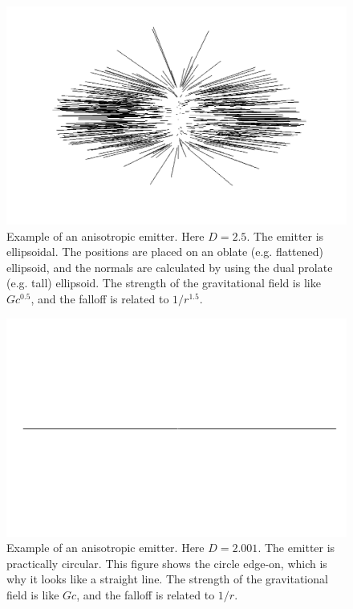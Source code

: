 \documentclass[12pt]{article}
\begin{document}
\begin{figure} 
\centering
  \includegraphics[width = 5 in]{2.5.png}
  \caption{
Example of an anisotropic emitter.
Here $D = 2.5$. 
The emitter is ellipsoidal.
The positions are placed on an oblate (e.g. flattened) ellipsoid, and the normals are calculated by using the dual prolate (e.g. tall) ellipsoid.
The strength of the gravitational field is like $G c^{0.5}$, and the falloff is related to $1/r^{1.5}$.
}
\end{figure}


\begin{figure} 
\centering
  \includegraphics[width = 5 in]{2.png}
  \caption{
Example of an anisotropic emitter.
Here $D = 2.001$. 
The emitter is practically circular. 
This figure shows the circle edge-on, which is why it looks like a straight line.
The strength of the gravitational field is like $Gc$, and the falloff is related to $1/r$.
}
\end{figure}
\end{document}
